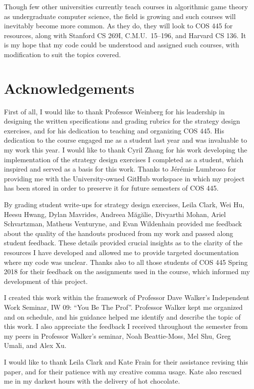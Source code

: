 \documentclass[pageno]{jpaper}
\begin{document}
Though few other universities currently teach courses in algorithmic game theory as undergraduate computer science, the field is growing and such courses will inevitably become more common.
As they do, they will look to COS 445 for resources, along with Stanford CS 269I, C.M.U.\ 15--196, and Harvard CS 136.
It is my hope that my code could be understood and assigned such courses, with modification to suit the topics covered.

\section*{Acknowledgements}
First of all, I would like to thank Professor Weinberg for his leadership in designing the written specifications and grading rubrics for the strategy design exercises, and for his dedication to teaching and organizing COS 445.
His dedication to the course engaged me as a student last year and was invaluable to my work this year.
I would like to thank Cyril Zhang for his work developing the implementation of the strategy design exercises I completed as a student, which inspired and served as a basis for this work.
Thanks to J\'er\'emie Lumbroso for providing me with the University-owned GitHub workspace in which my project has been stored in order to preserve it for future semesters of COS 445.

By grading student write-ups for strategy design exercises, Leila Clark, Wei Hu, Heesu Hwang, Dylan Mavrides, Andreea M\u{a}g\u{a}lie, Divyarthi Mohan, Ariel Schvartzman, Matheus Venturyne, and Evan Wildenhain provided me feedback about the quality of the handouts produced from my work and passed along student feedback.
These details provided crucial insights as to the clarity of the resources I have developed and allowed me to provide targeted documentation where my code was unclear.
Thanks also to all those students of COS 445 Spring 2018 for their feedback on the assignments used in the course, which informed my development of this project.

I created this work within the framework of Professor Dave Walker's Independent Work Seminar, IW 09: ``You Be The Prof''.
Professor Walker kept me organized and on schedule, and his guidance helped me identify and describe the topic of this work.
I also appreciate the feedback I received throughout the semester from my peers in Professor Walker's seminar, Noah Beattie-Moss, Mel Shu, Greg Umali, and Alex Xu.

I would like to thank Leila Clark and Kate Frain for their assistance revising this paper, and for their patience with my creative comma usage.
Kate also rescued me in my darkest hours with the delivery of hot chocolate.
\end{document}
